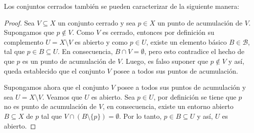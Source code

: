 Los conjuntos cerrados también se pueden caracterizar de la siguiente
manera:

\begin{proof}
Sea $V\subseteq X$ un conjunto cerrado y sea $p\in X$ un punto de acumulación
de $V$. Supongamos que $p\notin V$. Como $V$ es cerrado, entonces por definición
su complemento $U=X\setminus V$ es abierto y como $p\in U$, existe
un elemento básico $B\in\mathcal{B}$, tal que
$p\in B\subseteq U$. En consecuencia, $B\cap V=\emptyset$,
pero esto contradice el hecho de que $p$ es un punto de acumulación de $V$.
Luego, es falso suponer que $p\notin V$ y así, queda establecido que el
conjunto $V$ posee a todos sus puntos de acumulación.

Supongamos ahora que el conjunto $V$ posee a todos sus puntos de acumulación y
sea $U=X\setminus V$. Veamos que $U$ es abierto. Sea $p\in U$, por definición
se tiene que $p$ no es punto de acumulación de $V$, en consecuencia,
existe un entorno abierto $B\subseteq X$ de $p$ tal que $V\cap (B\setminus\{p\})=\emptyset$.
Por lo tanto, $p\in B\subseteq U$ y así, $U$ es abierto.
\end{proof}

